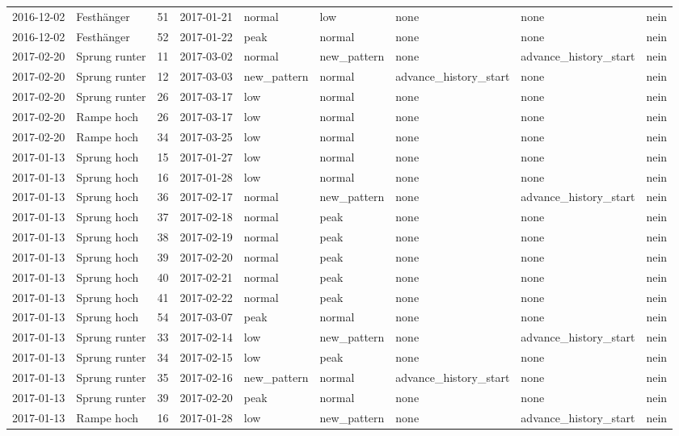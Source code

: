 \begin{tabular}{llrllllll}
2016-12-02 & Festhänger & 51 & 2017-01-21 & normal & low & none & none & nein \\
2016-12-02 & Festhänger & 52 & 2017-01-22 & peak & normal & none & none & nein \\
2017-02-20 & Sprung runter & 11 & 2017-03-02 & normal & new\_pattern & none & advance\_history\_start & nein \\
2017-02-20 & Sprung runter & 12 & 2017-03-03 & new\_pattern & normal & advance\_history\_start & none & nein \\
2017-02-20 & Sprung runter & 26 & 2017-03-17 & low & normal & none & none & nein \\
2017-02-20 & Rampe hoch & 26 & 2017-03-17 & low & normal & none & none & nein \\
2017-02-20 & Rampe hoch & 34 & 2017-03-25 & low & normal & none & none & nein \\
2017-01-13 & Sprung hoch & 15 & 2017-01-27 & low & normal & none & none & nein \\
2017-01-13 & Sprung hoch & 16 & 2017-01-28 & low & normal & none & none & nein \\
2017-01-13 & Sprung hoch & 36 & 2017-02-17 & normal & new\_pattern & none & advance\_history\_start & nein \\
2017-01-13 & Sprung hoch & 37 & 2017-02-18 & normal & peak & none & none & nein \\
2017-01-13 & Sprung hoch & 38 & 2017-02-19 & normal & peak & none & none & nein \\
2017-01-13 & Sprung hoch & 39 & 2017-02-20 & normal & peak & none & none & nein \\
2017-01-13 & Sprung hoch & 40 & 2017-02-21 & normal & peak & none & none & nein \\
2017-01-13 & Sprung hoch & 41 & 2017-02-22 & normal & peak & none & none & nein \\
2017-01-13 & Sprung hoch & 54 & 2017-03-07 & peak & normal & none & none & nein \\
2017-01-13 & Sprung runter & 33 & 2017-02-14 & low & new\_pattern & none & advance\_history\_start & nein \\
2017-01-13 & Sprung runter & 34 & 2017-02-15 & low & peak & none & none & nein \\
2017-01-13 & Sprung runter & 35 & 2017-02-16 & new\_pattern & normal & advance\_history\_start & none & nein \\
2017-01-13 & Sprung runter & 39 & 2017-02-20 & peak & normal & none & none & nein \\
2017-01-13 & Rampe hoch & 16 & 2017-01-28 & low & new\_pattern & none & advance\_history\_start & nein \\

\end{tabular}
